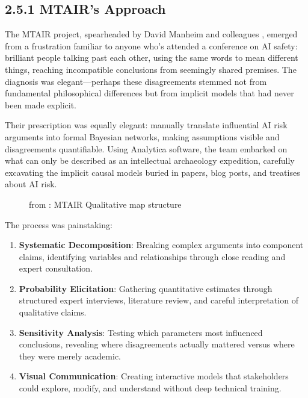 \documentclass[
  11pt,
  letterpaper,
]{book}
\providecommand{\tightlist}{%
  \setlength{\itemsep}{0pt}\setlength{\parskip}{0pt}}
\begin{document}
\subsection{2.5.1 MTAIR's Approach}\label{sec-mtair-approach}

The MTAIR project, spearheaded by David Manheim and colleagues
\textcite{clarke2022}, emerged from a frustration familiar to anyone
who's attended a conference on AI safety: brilliant people talking past
each other, using the same words to mean different things, reaching
incompatible conclusions from seemingly shared premises. The diagnosis
was elegant---perhaps these disagreements stemmed not from fundamental
philosophical differences but from implicit models that had never been
made explicit.

Their prescription was equally elegant: manually translate influential
AI risk arguments into formal Bayesian networks, making assumptions
visible and disagreements quantifiable. Using Analytica software, the
team embarked on what can only be described as an intellectual
archaeology expedition, carefully excavating the implicit causal models
buried in papers, blog posts, and treatises about AI risk.

\begin{figure}


\caption[MTAIR Qualitative map structure]{\label{fig-mtair-qual-map}from
\textcite{clarke2022}: MTAIR Qualitative map structure}

\end{figure}%

The process was painstaking:

\begin{enumerate}
\def\labelenumi{\arabic{enumi}.}
\tightlist
\item
  \textbf{Systematic Decomposition}: Breaking complex arguments into
  component claims, identifying variables and relationships through
  close reading and expert consultation.
\item
  \textbf{Probability Elicitation}: Gathering quantitative estimates
  through structured expert interviews, literature review, and careful
  interpretation of qualitative claims.
\item
  \textbf{Sensitivity Analysis}: Testing which parameters most
  influenced conclusions, revealing where disagreements actually
  mattered versus where they were merely academic.
\item
  \textbf{Visual Communication}: Creating interactive models that
  stakeholders could explore, modify, and understand without deep
  technical training.
\end{enumerate}
\end{document}
